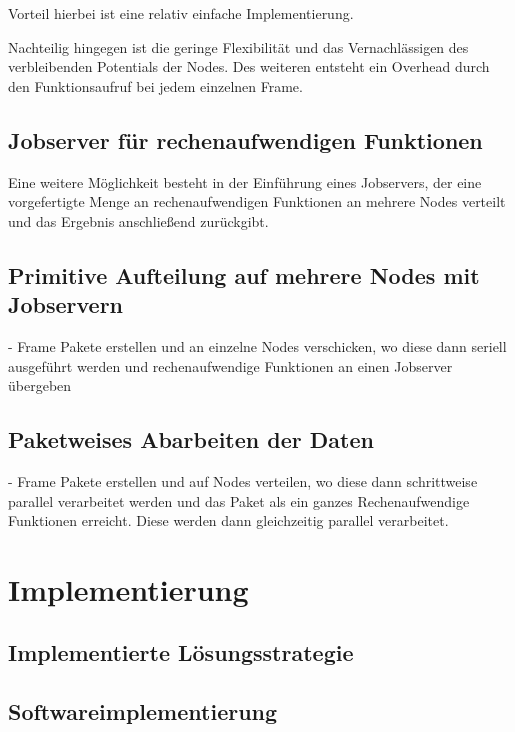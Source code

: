 Vorteil hierbei ist eine relativ einfache Implementierung. 

Nachteilig hingegen ist die geringe Flexibilität und das Vernachlässigen des verbleibenden Potentials der Nodes. Des weiteren entsteht ein Overhead durch den Funktionsaufruf bei jedem einzelnen Frame. 


\subsection{Jobserver für rechenaufwendigen Funktionen}
\label{subsec:jobserver}

Eine weitere Möglichkeit besteht in der Einführung eines Jobservers, der eine vorgefertigte Menge an rechenaufwendigen Funktionen an mehrere Nodes verteilt und das Ergebnis anschließend zurückgibt. 


\subsection{Primitive Aufteilung auf mehrere Nodes mit Jobservern}
 - Frame Pakete erstellen und an einzelne Nodes verschicken, wo diese dann seriell ausgeführt werden und rechenaufwendige Funktionen an einen Jobserver übergeben


\subsection{Paketweises Abarbeiten der Daten}
 - Frame Pakete erstellen und auf Nodes verteilen, wo diese dann schrittweise parallel verarbeitet werden und das Paket als ein ganzes Rechenaufwendige Funktionen erreicht. Diese werden dann gleichzeitig parallel verarbeitet. 


\section{Implementierung}

\subsection{Implementierte Lösungsstrategie}

\subsection{Softwareimplementierung}
\fi